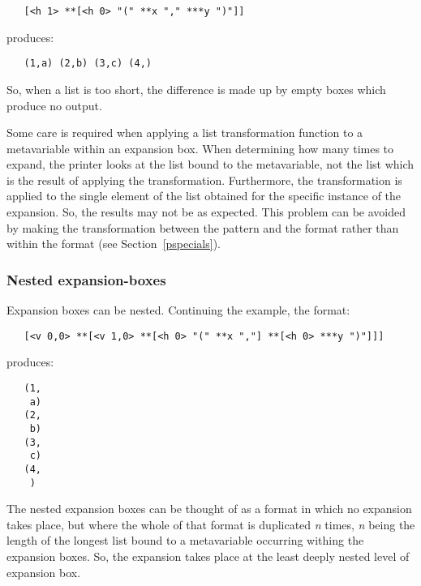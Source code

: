 \begin{small}\begin{verbatim}
   [<h 1> **[<h 0> "(" **x "," ***y ")"]]
\end{verbatim}\end{small}

\noindent
produces:

\begin{small}\begin{verbatim}
   (1,a) (2,b) (3,c) (4,)
\end{verbatim}\end{small}

\noindent
So, when a list is too short, the difference is made up by empty boxes which
produce no output.

Some care is required when applying a list transformation function to a
metavariable within an expansion box. When determining how many times to
expand, the printer looks at the list bound to the metavariable, not the list
which is the result of applying the transformation. Furthermore, the
transformation is applied to the single element of the list obtained for
the specific instance of the expansion. So, the results may not be as expected.
This problem can be avoided by making the transformation between the pattern
and the format rather than within the format (see Section~\ref{pspecials}).


\subsubsection{Nested expansion-boxes}

Expansion boxes can be nested. Continuing the example, the format:

\begin{small}\begin{verbatim}
   [<v 0,0> **[<v 1,0> **[<h 0> "(" **x ","] **[<h 0> ***y ")"]]]
\end{verbatim}\end{small}

\noindent
produces:

\begin{small}\begin{verbatim}
   (1,
    a)
   (2,
    b)
   (3,
    c)
   (4,
    )
\end{verbatim}\end{small}

\noindent
The nested expansion boxes can be thought of as a format in which no expansion
takes place, but where the whole of that format is duplicated {\it n\/} times,
{\it n\/} being the length of the longest list bound to a metavariable
occurring withing the expansion boxes. So, the expansion takes place at the
least deeply nested level of expansion box.

